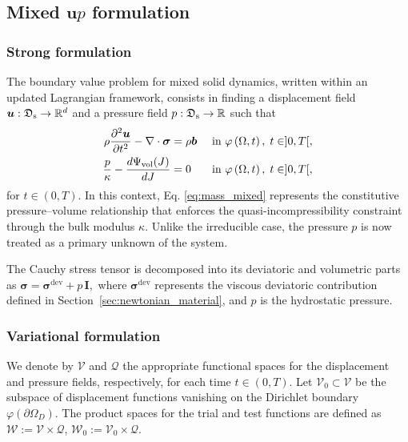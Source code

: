 \documentclass[11pt,english]{article}
\def\up{$\boldsymbol{u}p$\xspace}
\def\InitialDomain{\Omega}
\def\disp{\boldsymbol{u}}
\def\stress{\boldsymbol{\sigma}}
\def\SpaceDisp{\boldsymbol{\mathcal{V}}}
\def\SpacePress{\mathcal{Q}}
\def\SpaceTotal{\boldsymbol{\mathcal{W}}}
\def\VolPsi{\Psi_{\rm{vol}}}
\def\temp{\dfrac{\partial^2 \disp}{\partial t^2}}
\begin{document}
\subsection{Mixed \up formulation \label{sec:mixed-formulation}} 

\subsubsection{Strong formulation}
    
    The boundary value problem for mixed solid dynamics, written within an updated Lagrangian framework, consists in finding a displacement field
    $\disp:\mathfrak{D}_{\rm{s}}\rightarrow \mathbb{R}^d$
    and a pressure field
    $p:\mathfrak{D}_{\rm{s}}\rightarrow \mathbb{R}$
    such that
        \begin{align}
            \rho \temp-\nabla \cdot \stress  &= \rho \boldsymbol{b} && \text{ in } \varphi \left( \InitialDomain,t \right), \; t\in]0,T[, \label{eq:momentum_mixed}\\
            \dfrac{p}{\kappa}-\dfrac{d\VolPsi(J)}{dJ} &=0 && \text{ in } \varphi \left( \InitialDomain, t\right), \; t\in]0,T[, \label{eq:mass_mixed}
        \end{align}
   for $t \in (0,T)$. In this context, Eq. \eqref{eq:mass_mixed} represents the constitutive pressure--volume relationship that enforces the quasi-incompressibility constraint through the bulk modulus $\kappa$. Unlike the irreducible case, the pressure $p$ is now treated as a primary unknown of the system. 

The Cauchy stress tensor is decomposed into its deviatoric and volumetric parts as $\stress = \stress^{\mathrm{dev}} + p\,\mathbf{I}, $
where $\stress^{\mathrm{dev}}$ represents the viscous deviatoric contribution defined in Section~\ref{sec:newtonian_material}, and $p$ is the hydrostatic pressure.

\subsubsection{Variational formulation}

   We denote by $\SpaceDisp$ and $\SpacePress$ the appropriate functional spaces for the displacement and pressure fields, respectively, for each time $t \in (0,T)$. Let $\SpaceDisp_0 \subset \SpaceDisp$ be the subspace of displacement functions vanishing on the Dirichlet boundary $\varphi(\partial\Omega_D)$. The product spaces for the trial and test functions are defined as $
    \SpaceTotal := \SpaceDisp \times \SpacePress$,
    $\SpaceTotal_0 := \SpaceDisp_0 \times \SpacePress. $
    
\end{document}
